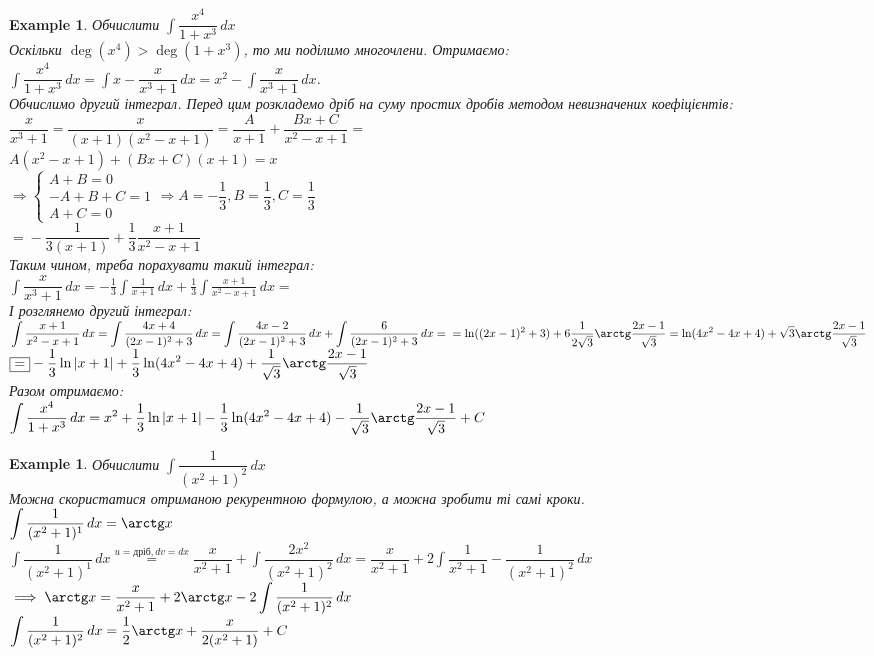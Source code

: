 \documentclass[a4paper, 10pt]{article}
\def\huge{\displaystyle}
\theoremstyle{theoremdd}
\theoremstyle{theoremdd}
\theoremstyle{theoremdd}
\theoremstyle{theoremdd}
\theoremstyle{theoremdd}
\newtheorem{example}[theorem]{Example}
\theoremstyle{theoremdd}
\theoremstyle{theoremdd}
\theoremstyle{theoremdd}
\theoremstyle{theoremdd}
\begin{document}
\begin{example}
Обчислити $\huge \int \dfrac{x^4}{1+x^3}\,dx$\\
Оскільки $\deg(x^4) > \deg(1+x^3)$, то ми поділимо многочлени. Отримаємо:\\
$\huge \int \dfrac{x^4}{1+x^3}\,dx = \int x - \dfrac{x}{x^3+1}\,dx = x^2 - \int \dfrac{x}{x^3+1}\,dx$.\\
Обчислимо другий інтеграл. Перед цим розкладемо дріб на суму простих дробів методом невизначених коефіцієнтів:\\
$\dfrac{x}{x^3+1} = \dfrac{x}{(x+1)(x^2-x+1)} = \dfrac{A}{x+1} + \dfrac{Bx+C}{x^2-x+1} \boxed{=}$\\
$A(x^2-x+1) + (Bx+C)(x+1) = x$\\
$\Rightarrow \begin{cases}
A + B = 0 \\
-A + B + C = 1\\
A + C = 0
\end{cases} \Rightarrow A = -\dfrac{1}{3}, B = \dfrac{1}{3}, C = \dfrac{1}{3}$\\
$\boxed{=} -\dfrac{1}{3(x+1)} + \dfrac{1}{3} \dfrac{x+1}{x^2-x+1}$\\
Таким чином, треба порахувати такий інтеграл:\\
$\huge \int \dfrac{x}{x^3+1}\,dx = -\frac{1}{3} \int \frac{1}{x+1}\,dx + \frac{1}{3} \int \frac{x+1}{x^2-x+1}\,dx \boxed{=}$\\
І розглянемо другий інтеграл:\\
$\huge \int \frac{x+1}{x^2-x+1}\,dx = \int \frac{4x+4}{(2x-1)^2 + 3}\,dx = \int \frac{4x-2}{(2x-1)^2 +3}\,dx + \int \frac{6}{(2x-1)^2 +3}\,dx = \\ = \ln((2x-1)^2+3) + 6 \dfrac{1}{2\sqrt{3}} \arctg \dfrac{2x-1}{\sqrt{3}} = \ln(4x^2-4x+4) + \sqrt{3} \arctg \dfrac{2x-1}{\sqrt{3}}$\\
$\boxed{=} \huge -\dfrac{1}{3} \ln|x+1| + \dfrac{1}{3} \ln(4x^2-4x+4) + \dfrac{1}{\sqrt{3}} \arctg \dfrac{2x-1}{\sqrt{3}}$\\
Разом отримаємо:\\
$\huge \int \dfrac{x^4}{1+x^3}\,dx = x^2 + \dfrac{1}{3} \ln|x+1| - \dfrac{1}{3} \ln(4x^2-4x+4) - \dfrac{1}{\sqrt{3}} \arctg \dfrac{2x-1}{\sqrt{3}} + C$
\end{example}

\begin{example}
Обчислити $\huge\int \dfrac{1}{(x^2+1)^2}\,dx$\\
Можна скористатися отриманою рекурентною формулою, а можна зробити ті самі кроки.\\
$\huge \int \dfrac{1}{(x^2+1)^1}\,dx = \arctg x$\\
$\huge \int \dfrac{1}{(x^2+1)^1}\,dx \overset{u=\text{дріб}, dv = dx}{=} \dfrac{x}{x^2+1} + \int \dfrac{2x^2}{(x^2+1)^2}\,dx = \dfrac{x}{x^2+1} + 2\int \dfrac{1}{x^2+1} - \dfrac{1}{(x^2+1)^2}\,dx$\\
$\implies \huge \arctg x = \dfrac{x}{x^2+1} + 2\arctg x - 2 \int \dfrac{1}{(x^2+1)^2}\,dx$\\
$\huge\int \dfrac{1}{(x^2+1)^2}\,dx = \dfrac{1}{2} \arctg x + \dfrac{x}{2(x^2+1)} + C$
\end{example}
\end{document}
